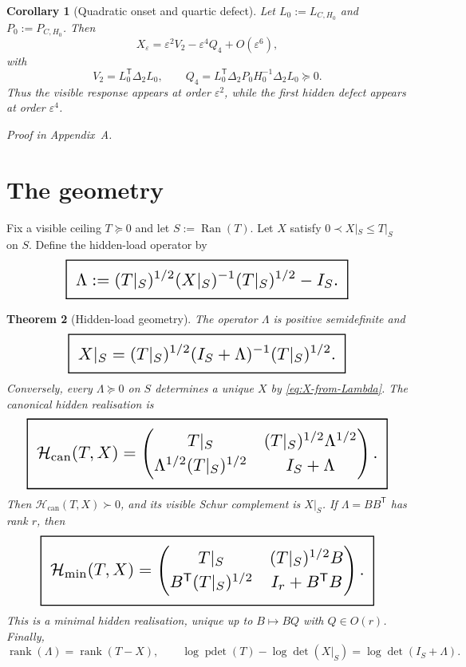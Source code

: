\documentclass[11pt,a4paper]{article}
\numberwithin{equation}{section}
\DeclareMathOperator{\Ran}{Ran}
\DeclareMathOperator{\rank}{rank}
\DeclareMathOperator{\pdet}{pdet}
\newcommand{\geomboxed}[1]{%
  \setlength{\fboxsep}{8pt}%
  \setlength{\fboxrule}{0.9pt}%
  \fbox{\scalebox{1.5}{$\displaystyle #1$}}%
}
\theoremstyle{thmcompact}
\newtheorem{theorem}{Theorem}[section]
\newtheorem{corollary}[theorem]{Corollary}
\theoremstyle{remark}
\newcommand{\proofappendix}{\par{\hfill\scriptsize\emph{Proof in Appendix~A.}}\par}
\begin{document}
\begin{corollary}[Quadratic onset and quartic defect]
\label{cor:quartic-defect}
Let $L_0:=L_{C,H_0}$ and $P_0:=P_{C,H_0}$. Then
\begin{equation}
X_{\varepsilon}=\varepsilon^2V_2-\varepsilon^4Q_4+O(\varepsilon^6),
\label{eq:quartic-expansion}
\end{equation}
with
\begin{equation}
V_2=L_0^{\mathsf T}\Delta_2L_0,
\qquad
Q_4=L_0^{\mathsf T}\Delta_2P_0H_0^{-1}\Delta_2L_0\succeq 0.
\label{eq:V2Q4-def}
\end{equation}
Thus the visible response appears at order $\varepsilon^2$, while the first hidden defect appears at order $\varepsilon^4$.
\end{corollary}

\proofappendix

\section{The geometry}
\label{sec:geometry}

Fix a visible ceiling $T\succeq 0$ and let $S:=\Ran(T)$. Let $X$ satisfy $0\prec X|_S\le T|_S$ on $S$. Define the hidden-load operator by
\begin{equation}
\label{eq:hidden-load-def}
\geomboxed{\Lambda:=(T|_S)^{1/2}(X|_S)^{-1}(T|_S)^{1/2}-I_S.}
\end{equation}

\begin{theorem}[Hidden-load geometry]
\label{thm:hidden-load}
The operator $\Lambda$ is positive semidefinite and
\begin{equation}
\label{eq:X-from-Lambda}
\geomboxed{X|_S=(T|_S)^{1/2}(I_S+\Lambda)^{-1}(T|_S)^{1/2}.}
\end{equation}
Conversely, every $\Lambda\succeq 0$ on $S$ determines a unique $X$ by \eqref{eq:X-from-Lambda}. The canonical hidden realisation is
\begin{equation}
\label{eq:canonical-hidden}
\geomboxed{\mathcal H_{\mathrm{can}}(T,X)=
\begin{pmatrix}
T|_S & (T|_S)^{1/2}\Lambda^{1/2}\\[2pt]
\Lambda^{1/2}(T|_S)^{1/2} & I_S+\Lambda
\end{pmatrix}.}
\end{equation}
Then $\mathcal H_{\mathrm{can}}(T,X)\succ 0$, and its visible Schur complement is $X|_S$. If $\Lambda=BB^{\mathsf T}$ has rank $r$, then
\begin{equation}
\label{eq:min-hidden}
\geomboxed{\mathcal H_{\min}(T,X)=
\begin{pmatrix}
T|_S & (T|_S)^{1/2}B\\[2pt]
B^{\mathsf T}(T|_S)^{1/2} & I_r+B^{\mathsf T}B
\end{pmatrix}.}
\end{equation}
This is a minimal hidden realisation, unique up to $B\mapsto BQ$ with $Q\in O(r)$. Finally,
\begin{equation}
\rank(\Lambda)=\rank(T-X),
\qquad
\log\pdet(T)-\log\det(X|_S)=\log\det(I_S+\Lambda).
\label{eq:rank-and-clock}
\end{equation}
\end{theorem}
\end{document}
